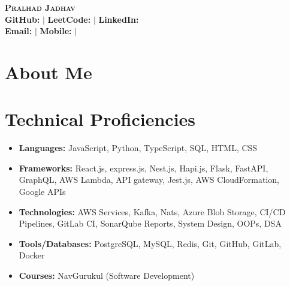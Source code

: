 \documentclass[letterpaper,11pt]{article}
\newcommand{\resumeSubHeadingListStart}{\begin{itemize}[leftmargin=0.15in, label={}]}
\newcommand{\resumeSubHeadingListEnd}{\end{itemize}}
\begin{document}

\vspace{-10pt}
\vspace{-10pt}
\vspace{-10pt}
\vspace{-10pt}
\begin{center} 

    \textbf{\Huge \scshape Pralhad Jadhav} \\ \vspace{5pt}
    \textbf{GitHub:}\href{https://github.com/pralhad88}{}   $|$ 
    \textbf{LeetCode:}\href{https://leetcode.com/u/pralhad1096/}{} $|$ \textbf{LinkedIn:}\href{https://www.linkedin.com/in/pralhad-jadhav-7073b1174/}{}
    \\ \vspace{1pt}
    \textbf{Email:}\href{mailto:pralhad1096@gmail.com}{} $|$ \textbf{Mobile:}\href{tel:7666077878}{} $|$ 
    \\ \vspace{1pt}

\end{center}

\section{About Me}
\resumeSubHeadingListStart
{}
\vspace{-3pt}
\resumeSubHeadingListEnd

\section*{Technical Proficiencies}
\begin{itemize}[left=0pt, itemsep=1pt]
  \item \textbf{Languages:} JavaScript, Python, TypeScript, SQL, HTML, CSS
  \item \textbf{Frameworks:} React.js, express.js, Nest.js, Hapi.js, Flask, FastAPI, GraphQL, AWS Lambda, API gateway, Jest.js, AWS CloudFormation, Google APIs
  \item \textbf{Technologies:}  AWS Services, Kafka, Nats, Azure Blob Storage, CI/CD Pipelines, GitLab CI, SonarQube Reports, System Design, OOPs, DSA  
  \item \textbf{Tools/Databases:} PostgreSQL, MySQL, Redis, Git, GitHub, GitLab, Docker 
  \item \textbf{Courses:} NavGurukul (Software Development)
\end{itemize}
\end{document}
